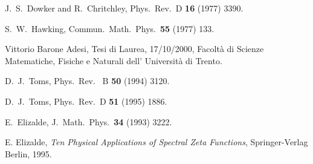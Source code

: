 \documentclass [11pt]{article}
\begin{document}
\begin{thebibliography}{10}
J.~S.~Dowker and R.~Chritchley,
Phys.\ Rev.\ D {\bf 16} (1977) 3390.

S.~W.~Hawking,
Commun.\ Math.\ Phys.\  {\bf 55} (1977) 133.


Vittorio Barone Adesi, Tesi di Laurea, 17/10/2000, 
Facolt\`a di Scienze Matematiche, Fisiche e Naturali dell' Universit\`a di
Trento.


D.~J.~Toms,
Phys.\ Rev. \ B {\bf 50} (1994) 3120.


D.~J.~Toms,
Phys.\ Rev.\ D {\bf 51} (1995) 1886.

E.~Elizalde,
J.\ Math.\ Phys.\  {\bf 34} (1993) 3222.


E. Elizalde, 
\emph{Ten Physical Applications of Spectral Zeta Functions}, Springer-Verlag 
Berlin, 1995.


\end{thebibliography}
\end{document}
